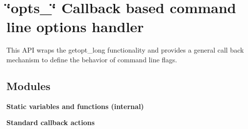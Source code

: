 \section{\char`\"{}opts\_\-\char`\"{} Callback based command line options handler}
\label{group__opts}
This API wraps the getopt\_\-long functionality and provides a general call back mechanism to define the behavior of command line flags. 
\subsection*{Modules}
\begin{CompactItemize}
\item 
{\bf Static variables and functions (internal)}
\item 
{\bf Standard callback actions}
\end{CompactItemize}
